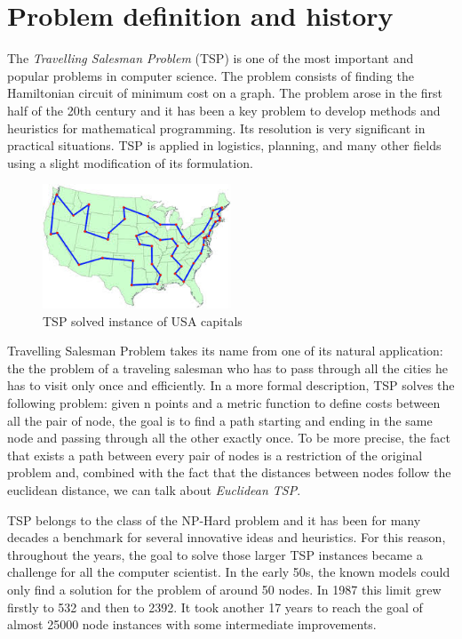 \section{Problem definition and history}
The \emph{Travelling Salesman Problem} (TSP) is one of the most important and popular
problems in computer science. The problem consists of finding the Hamiltonian
circuit of minimum cost on a graph. The problem arose in the first half of the
20th century and it has been a key problem to develop methods and heuristics
for mathematical programming. Its resolution is very significant in practical
situations. TSP is applied in logistics, planning, and many other fields using
a slight modification of its formulation.

\begin{figure}[H] 
    \centering
    \includegraphics[width= 0.5\textwidth]{figures/tspexample.jpg} 
    \caption[TSP solved instance of USA capitals]{TSP solved instance of USA capitals}
    \label{fig:flow around cylinder} 
\end{figure} 

Travelling Salesman Problem takes its name from one of its natural application: the
the problem of a traveling salesman who has to pass through all the cities he has to
visit only once and efficiently. In a more formal description, TSP solves the following
problem: given n points and a metric function to define costs between all the pair
of node, the goal is to find a path starting and ending in the same node and passing
through all the other exactly once. To be more precise, the fact that exists a path
between every pair of nodes is a restriction of the original problem and, combined
with the fact that the distances between nodes follow the euclidean distance, we
can talk about \emph{Euclidean TSP}.

TSP belongs to the class of the NP-Hard problem and it has been for many decades
a benchmark for several innovative ideas and heuristics. For this reason,
throughout the years, the goal to solve those larger TSP instances became a
challenge for all the computer scientist. In the early 50s, the known models
could only find a solution for the problem of around 50
nodes\citep{dantzig1954solution}. In 1987 this limit grew firstly to 532 and
then to 2392. It took another 17 years to reach the goal of almost 25000 node
instances with some intermediate improvements.


